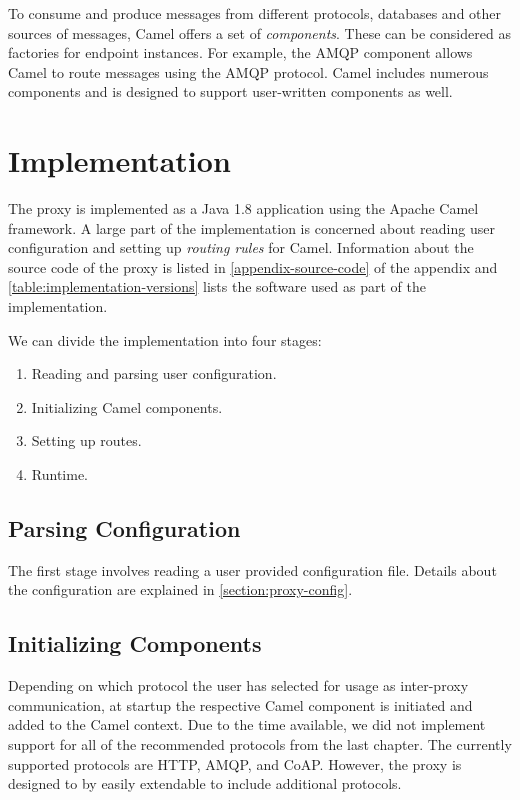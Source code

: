 To consume and produce messages from different protocols, databases and other
sources of messages, Camel offers a set of \textit{components}. These can be
considered as factories for endpoint instances. For example, the AMQP component
allows Camel to route messages using the AMQP protocol. Camel includes numerous
components and is designed to support user-written components as well.


\section{Implementation}

The proxy is implemented as a Java 1.8 application using the Apache Camel
framework. A large part of the implementation is concerned about reading user
configuration and setting up \textit{routing rules} for Camel. Information about
the source code of the proxy is listed in \cref{appendix-source-code} of the
appendix and \cref{table:implementation-versions} lists the software used as
part of the implementation.

We can divide the implementation into four stages:

\begin{enumerate}
    \item Reading and parsing user configuration.
    \item Initializing Camel components.
    \item Setting up routes.
    \item Runtime.
\end{enumerate}

\subsection{Parsing Configuration}

The first stage involves reading a user provided configuration file. Details
about the configuration are explained in \cref{section:proxy-config}.

\subsection{Initializing Components}

Depending on which protocol the user has selected for usage as inter-proxy
communication, at startup the respective Camel component is initiated and added
to the Camel context. Due to the time available, we did not implement support
for all of the recommended protocols from the last chapter. The currently
supported protocols are HTTP, AMQP, and CoAP. However, the proxy is designed to
by easily extendable to include additional protocols.

